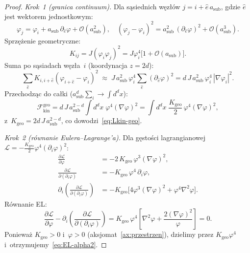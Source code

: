 \begin{proof}
\emph{Krok~1 (granica continuum).}
Dla s\k{a}siednich w\k{e}z\l{}\'ow $j = i + \hat{e}\,a_{\mathrm{sub}}$,
gdzie $\hat{e}$ jest wektorem jednostkowym:
\begin{equation}
  \varphi_j = \varphi_i + a_{\mathrm{sub}}\,\partial_{\hat{e}}\varphi
    + \mathcal{O}(a_{\mathrm{sub}}^2),
  \quad
  (\varphi_j - \varphi_i)^2
    = a_{\mathrm{sub}}^2\,(\partial_{\hat{e}}\varphi)^2
    + \mathcal{O}(a_{\mathrm{sub}}^3).
\end{equation}
Sprz\k{e}\.zenie geometryczne:
\begin{equation}
  K_{ij} = J(\varphi_i\varphi_j)^2
  = J\varphi_i^4\bigl[1 + \mathcal{O}(a_{\mathrm{sub}})\bigr].
\end{equation}
Suma po s\k{a}siadach w\k{e}z\l{}a~$i$ (koordynacja $z = 2d$):
\begin{equation}
  \sum_{\hat{e}} K_{i,i+\hat{e}}(\varphi_{i+\hat{e}} - \varphi_i)^2
  \;\approx\; J\,a_{\mathrm{sub}}^2\,\varphi_i^4\!
    \sum_{\hat{e}} (\partial_{\hat{e}}\varphi)^2
  = d\,J\,a_{\mathrm{sub}}^2\,\varphi_i^4\,|\nabla\varphi_i|^2.
\end{equation}
Przechodz\k{a}c do ca\l{}ki
($a_{\mathrm{sub}}^d\sum_i \to \int d^d x$):
\begin{equation}
  \mathcal{F}_{\mathrm{kin}}^{\mathrm{geo}}
  = d\,J\,a_{\mathrm{sub}}^{2-d}\!\int d^d x\;
    \varphi^4(\nabla\varphi)^2
  = \int d^d x\;
    \frac{K_{\mathrm{geo}}}{2}\,\varphi^4(\nabla\varphi)^2,
\end{equation}
z~$K_{\mathrm{geo}} = 2d\,J\,a_{\mathrm{sub}}^{2-d}$,
co dowodzi~\eqref{eq:Lkin-geo}.

\emph{Krok~2 (r\'ownanie Eulera--Lagrange'a).}
Dla g\k{e}sto\'sci lagrangianowej
$\mathcal{L} = -\tfrac{K_{\mathrm{geo}}}{2}\varphi^4(\partial_i\varphi)^2$:
\begin{align}
  \frac{\partial\mathcal{L}}{\partial\varphi}
    &= -2\,K_{\mathrm{geo}}\,\varphi^3(\nabla\varphi)^2, \\
  \frac{\partial\mathcal{L}}{\partial(\partial_i\varphi)}
    &= -K_{\mathrm{geo}}\,\varphi^4\,\partial_i\varphi, \\[3pt]
  \partial_i\!\left(\frac{\partial\mathcal{L}}
    {\partial(\partial_i\varphi)}\right)
    &= -K_{\mathrm{geo}}\bigl[
      4\varphi^3(\nabla\varphi)^2 + \varphi^4\nabla^2\varphi
      \bigr].
\end{align}
R\'ownanie EL:
\begin{equation}
  \frac{\partial\mathcal{L}}{\partial\varphi}
  - \partial_i\!\left(\frac{\partial\mathcal{L}}
    {\partial(\partial_i\varphi)}\right)
  = K_{\mathrm{geo}}\,\varphi^4\!
    \left[\nabla^2\varphi
      + \frac{2(\nabla\varphi)^2}{\varphi}\right] = 0.
\end{equation}
Poniewa\.z $K_{\mathrm{geo}} > 0$ i~$\varphi > 0$
(aksjomat~\ref{ax:przestrzen}), dzielimy przez $K_{\mathrm{geo}}\varphi^4$
i~otrzymujemy~\eqref{eq:EL-alpha2}.


\end{proof}
